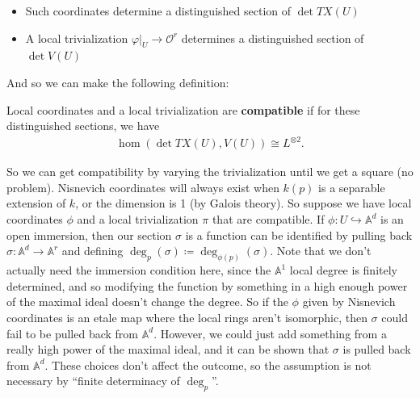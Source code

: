 \begin{remark}

\envlist

\begin{itemize}
\tightlist
\item
  Such coordinates determine a distinguished section of \(\det TX(U)\)
\item
  A local trivialization
  \({\left.{{\varphi}} \right|_{{U}} } \to {\mathcal{O}}^r\) determines
  a distinguished section of \(\det V(U)\)
\end{itemize}

And so we can make the following definition:

\end{remark}

\begin{definition}

Local coordinates and a local trivialization are \textbf{compatible} if
for these distinguished sections, we have
\begin{align*}
\hom(\det TX(U), V(U)) \cong L^{\otimes 2}.
\end{align*}

\end{definition}

So we can get compatibility by varying the trivialization until we get a
square (no problem). Nisnevich coordinates will always exist when
\(k(p)\) is a separable extension of \(k\), or the dimension is 1 (by
Galois theory). So suppose we have local coordinates \(\phi\) and a
local trivialization \(\pi\) that are compatible. If
\(\phi: U \hookrightarrow{\mathbb{A}}^d\) is an open immersion, then our
section \(\sigma\) is a function can be identified by pulling back
\(\sigma: {\mathbb{A}}^d \to {\mathbb{A}}^r\) and defining
\(\deg_p(\sigma) \coloneqq\deg_{\phi(p)}(\sigma)\). Note that we don't
actually need the immersion condition here, since the \({\mathbb{A}}^1\)
local degree is finitely determined, and so modifying the function by
something in a high enough power of the maximal ideal doesn't change the
degree. So if the \(\phi\) given by Nisnevich coordinates is an etale
map where the local rings aren't isomorphic, then \(\sigma\) could fail
to be pulled back from \({\mathbb{A}}^d\). However, we could just add
something from a really high power of the maximal ideal, and it can be
shown that \(\sigma\) is pulled back from \({\mathbb{A}}^d\). These
choices don't affect the outcome, so the assumption is not necessary by
``finite determinacy of \(\deg_p\)''.

